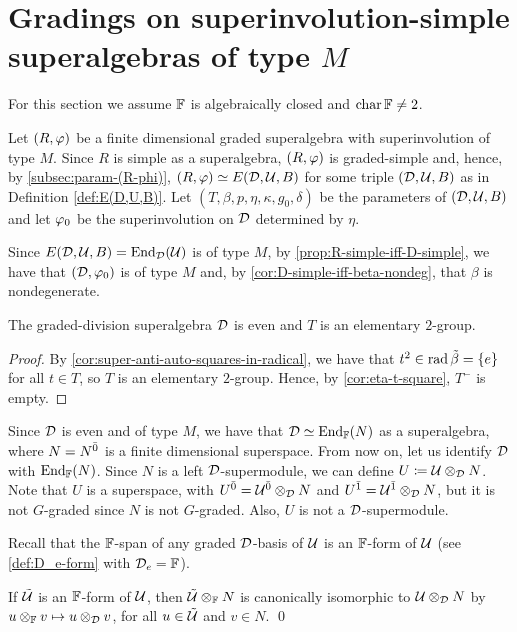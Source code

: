 \section[Gradings on superinvolution-simple superalgebras of type \texorpdfstring{$M$}{M}]{Gradings on superinvolution-simple \\ superalgebras of type $M$}

For this section we assume $\mathbb{F}$ is algebraically closed and $\operatorname{char} \mathbb{F} \neq 2$.

Let $(R, \varphi)$ be a finite dimensional graded superalgebra with superinvolution of type $M$. 
Since $R$ is simple as a superalgebra, $(R, \varphi)$ is graded-simple and, hence, by \cref{subsec:param-(R-phi)}, $(R, \varphi) \simeq E(\mathcal{D}, \mathcal U, B)$ for some triple $(\mathcal{D}, \mathcal U, B)$ as in Definition \ref{def:E(D,U,B)}. 
Let $(T, \beta, p, \eta, \kappa, g_0, \delta)$ be the parameters of $(\mathcal{D}, \mathcal U, B)$ and let $\varphi_0$ be the superinvolution on $\mathcal{D}$ determined by $\eta$.

Since $E(\mathcal{D}, \mathcal U, B) = \operatorname{End}_{\mathcal{D}} (\mathcal U)$ is of type $M$, by \cref{prop:R-simple-iff-D-simple}, we have that $(\mathcal{D}, \varphi_0)$ is of type $M$ and, by  \cref{cor:D-simple-iff-beta-nondeg}, that $\beta$ is nondegenerate. 

\begin{lemma}\label{lemma:sinv-type-M}
    The graded-division superalgebra $\mathcal{D}$ is even and $T$ is an elementary $2$-group.
\end{lemma}

\begin{proof}
    By \cref{cor:super-anti-auto-squares-in-radical}, we have that $t^2 
    \in \operatorname{rad}\tilde\beta = \{e\}$ for all $t\in T$, so $T$ is an elementary $2$-group. 
    Hence, by \cref{cor:eta-t-square}, $T^-$ is empty. 
\end{proof}

Since $\mathcal{D}$ is even and of type $M$, we have that $\mathcal{D} \simeq \operatorname{End}_{\mathbb{F}} (N)$ as a superalgebra, where $N = N^{\bar0}$ is a finite dimensional superspace.
From now on, let us identify $\mathcal{D}$ with $\operatorname{End}_{\mathbb{F}}(N)$. 
Since $N$ is a left $\mathcal{D}$-supermodule, we can define $U \coloneqq \mathcal U \otimes_{\mathcal{D}} N$. 
Note that $U$ is a superspace, with $U^{\bar0} = \mathcal U^{\bar0} \otimes_{\mathcal{D}} N$ and $U^{\bar1} = \mathcal U^{\bar1} \otimes_{\mathcal{D}} N$, but it is not $G$-graded since $N$ is not $G$-graded. 
Also, $U$ is not a $\mathcal{D}$-supermodule. 

Recall that the $\mathbb{F}$-span of any graded $\mathcal{D}$-basis of $\mathcal U$ is an $\mathbb{F}$-form of $\mathcal U$ (see \cref{def:D_e-form} with $\mathcal{D}_e = \mathbb{F}$). 

\begin{lemma}\label{lemma:FF-basis-for-U}
    If $\tilde{\mathcal U}$ is an $\mathbb{F}$-form of $\mathcal U$, then $\tilde{\mathcal U} \otimes_{\mathbb{F}} N$ is canonically isomorphic to $\mathcal U \otimes_{\mathcal{D}} N$ by $u\otimes_{\mathbb{F}} v \mapsto u\otimes_{\mathcal{D}} v$, for all $u\in \tilde{\mathcal U}$ and $v\in N$. \qed
\end{lemma}

